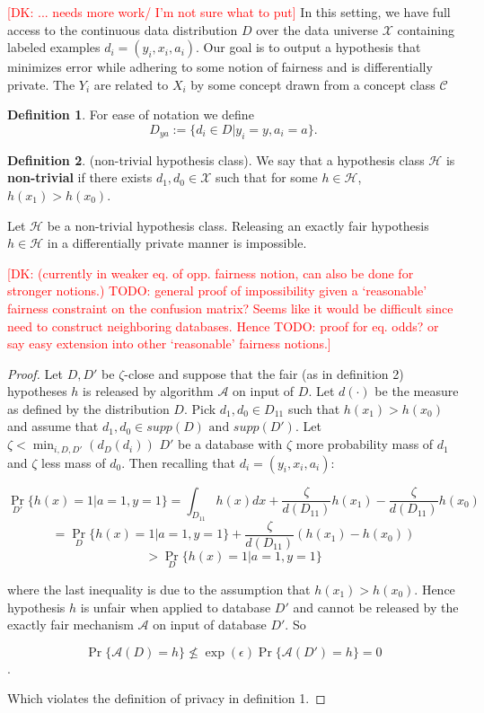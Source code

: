 \documentclass[format = sigconf]{acmart}
\newcommand{\dk}[1]{\textcolor{red}{[DK: #1]}}
\newcommand{\A}{\mathcal{A}}
\renewcommand{\H}{\mathcal{H}}
\newcommand{\C}{\mathcal{C}}
\newcommand{\X}{\mathcal{X}}
\newcommand{\1}{\mathbbm{1}}
\newcommand{\eps}{\epsilon}
\newcommand{\zt}{\zeta}
\theoremstyle{definition}
\newtheorem{defn}{Definition}[section]
\begin{document}
\dk {... needs more work/ I'm not sure what to put}
In this setting, we have full access to the continuous data distribution $D$ over the data universe $\X$ containing labeled examples $d_i = (y_i,x_i,a_i)$. Our goal is to output a hypothesis that minimizes error while adhering to some notion of fairness and is differentially private. The $Y_i$ are related to $X_i$ by some concept drawn from a concept class $\C$




\begin{defn}
	For ease of notation we define
	$$D_{ya} := \{d_i \in D | y_i = y, a_i = a \}.$$
\end{defn}
\begin{defn}
	(non-trivial hypothesis class). We say that a hypothesis class $\H$ is {\bf non-trivial} if there exists $d_1, d_0 \in \mathcal{X}$ such that for some $h \in \H$, $h(x_1) > h(x_0)$.
\end{defn}
\begin{lemma}Let $\mathcal{H}$ be a non-trivial hypothesis class. Releasing an exactly fair hypothesis $h\in \mathcal{H}$ in a differentially private manner is impossible.
\end{lemma}
\dk{ (currently in weaker eq. of opp. fairness notion, can also be done for stronger notions.) TODO: general proof of impossibility given a `reasonable' fairness constraint on the confusion matrix? Seems like it would be difficult since need to construct neighboring databases. Hence TODO: proof for eq. odds? or say easy extension into other `reasonable' fairness notions.}

\begin{proof}
	Let $D, D'$ be $\zt$-close and suppose that the fair (as in definition 2) hypotheses $h$ is released by algorithm $\mathcal{A}$ on input of $D$. Let $d(\cdot)$ be the measure as defined by the distribution $D$. Pick $d_1, d_0 \in D_{11}$ such that $h(x_1) > h(x_0)$ and assume that $d_1, d_0 \in supp(D) \text{ and } supp(D')$. Let $\zt < \min_{i,D,D'}(d_{D}(d_i))$ $D'$ be a database with $\zt$ more probability mass of $d_1$ and $\zt$ less mass of $d_0$. Then recalling that $d_i = (y_i, x_i, a_i)$:

$$\Pr_{D'}\{h(x) = 1 | a = 1, y=1\} = \int_{D_{11}}h(x)dx + \frac{\zt}{d(D_{11})} h(x_1) - \frac{\zt}{d(D_{11})} h(x_0) $$
$$= \Pr_{D}\{h(x) = 1 | a = 1, y=1\} + \frac{\zt}{d(D_{11})} (h(x_1) - h(x_0))$$
$$>  \Pr_{D}\{h(x) = 1 | a = 1, y=1\}$$

where the last inequality is due to the assumption that $h(x_1) > h(x_0)$. Hence hypothesis $h$ is unfair when applied to database $D'$ and cannot be released by the exactly fair mechanism $\A$ on input of database $D'$. So

$$\Pr\{\mathcal{A}(D) = h\} \not\leq \exp(\eps)\Pr\{\mathcal{A}(D') = h\} = 0$$.

Which violates the definition of privacy in definition 1.
\end{proof}
\end{document}
